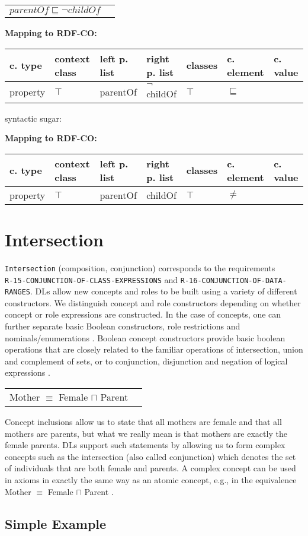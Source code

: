 \documentclass{llncs}
\newcommand{\ms}[1]{\texttt{#1}}
\newenvironment{gcotable}{
  \scriptsize
  \sffamily
  \vspace{0cm}
	\begin{center}
	\textbf{\vspace{0.4cm}Mapping to RDF-CO:} \\
  \begin{tabular}{l|l|l|l|l|l|l}
	\hline
  \textbf{c. type} & \textbf{context class} & \textbf{left p. list} & \textbf{right p. list} & \textbf{classes} & \textbf{c. element} & \textbf{c. value} \\
  \hline

}{
  \hline
  \end{tabular}
	\end{center}
}
\newenvironment{DL}{
  \vspace{0cm}
	\begin{center}
  \begin{tabular}{r l}

}{
  \end{tabular}
	\end{center}
}
\begin{document}
\begin{DL}
$parentOf \sqsubseteq \neg childOf$
\end{DL}

\begin{gcotable}
property & $\top$ & parentOf & $\neg$childOf & $\top$ & $\sqsubseteq$ \\
\end{gcotable}

syntactic sugar:

\begin{gcotable}
property & $\top$ & parentOf & childOf & $\top$ & $\ne$ \\
\end{gcotable}

\section{Intersection}

\ms{Intersection} (composition, conjunction) corresponds to the requirements \\
\ms{R-15-CONJUNCTION-OF-CLASS-EXPRESSIONS} and \ms{R-16-CONJUNCTION-OF-DATA-} \ms{RANGES}.
DLs allow new concepts and roles to be
built using a variety of different constructors. We distinguish concept and role 
constructors depending on whether concept or role expressions are constructed. In the case of
concepts, one can further separate basic Boolean constructors, role restrictions and nominals/enumerations \cite{Kroetzsch2012}.
Boolean concept constructors provide basic boolean operations that are closely related to
the familiar operations of intersection, union and complement of sets, or to conjunction,
disjunction and negation of logical expressions \cite{Kroetzsch2012}.

\begin{DL}
Mother $\equiv$ Female $\sqcap$ Parent
\end{DL}

Concept inclusions allow us to state that all mothers are female and that
all mothers are parents, but what we really mean is that mothers are exactly the female
parents. DLs support such statements by allowing us to form complex concepts such as
the intersection (also called conjunction)
which denotes the set of individuals that are both female and parents. A complex concept
can be used in axioms in exactly the same way as an atomic concept, e.g., in the
equivalence Mother $\equiv$ Female $\sqcap$ Parent .

\subsection{Simple Example}
\end{document}
